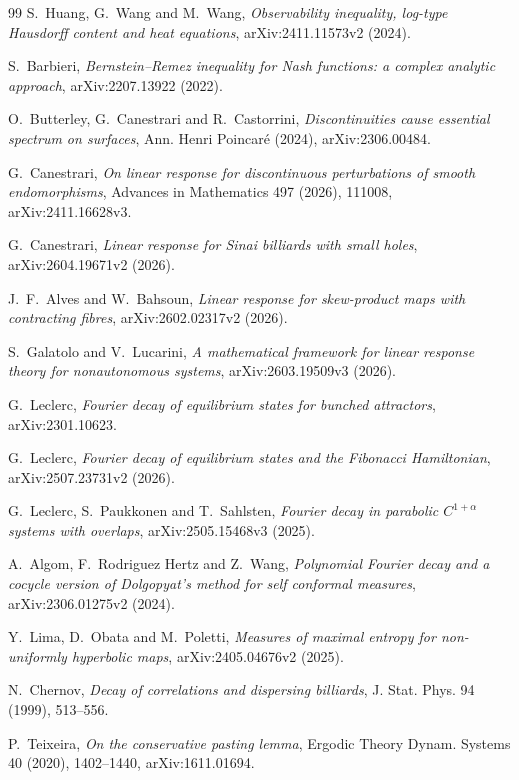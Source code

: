 \documentclass[11pt]{article}
\begin{document}
\begin{thebibliography}{99}
S.~Huang, G.~Wang and M.~Wang,
\emph{Observability inequality, log-type Hausdorff content and heat equations},
arXiv:2411.11573v2 (2024).

S.~Barbieri,
\emph{Bernstein--Remez inequality for Nash functions: a complex analytic
approach}, arXiv:2207.13922 (2022).

O.~Butterley, G.~Canestrari and R.~Castorrini,
\emph{Discontinuities cause essential spectrum on surfaces},
Ann. Henri Poincar\'e (2024), arXiv:2306.00484.

G.~Canestrari,
\emph{On linear response for discontinuous perturbations of smooth
endomorphisms}, Advances in Mathematics 497 (2026), 111008,
arXiv:2411.16628v3.

G.~Canestrari,
\emph{Linear response for Sinai billiards with small holes},
arXiv:2604.19671v2 (2026).

J.~F.~Alves and W.~Bahsoun,
\emph{Linear response for skew-product maps with contracting fibres},
arXiv:2602.02317v2 (2026).

S.~Galatolo and V.~Lucarini,
\emph{A mathematical framework for linear response theory for nonautonomous
systems}, arXiv:2603.19509v3 (2026).

G.~Leclerc,
\emph{Fourier decay of equilibrium states for bunched attractors},
arXiv:2301.10623.

G.~Leclerc,
\emph{Fourier decay of equilibrium states and the Fibonacci Hamiltonian},
arXiv:2507.23731v2 (2026).

G.~Leclerc, S.~Paukkonen and T.~Sahlsten,
\emph{Fourier decay in parabolic $C^{1+\alpha}$ systems with overlaps},
arXiv:2505.15468v3 (2025).

A.~Algom, F.~Rodriguez Hertz and Z.~Wang,
\emph{Polynomial Fourier decay and a cocycle version of Dolgopyat's method
for self conformal measures}, arXiv:2306.01275v2 (2024).

Y.~Lima, D.~Obata and M.~Poletti,
\emph{Measures of maximal entropy for non-uniformly hyperbolic maps},
arXiv:2405.04676v2 (2025).

N.~Chernov,
\emph{Decay of correlations and dispersing billiards},
J. Stat. Phys. 94 (1999), 513--556.

P.~Teixeira,
\emph{On the conservative pasting lemma},
Ergodic Theory Dynam. Systems 40 (2020), 1402--1440,
arXiv:1611.01694.


\end{thebibliography}
\end{document}
